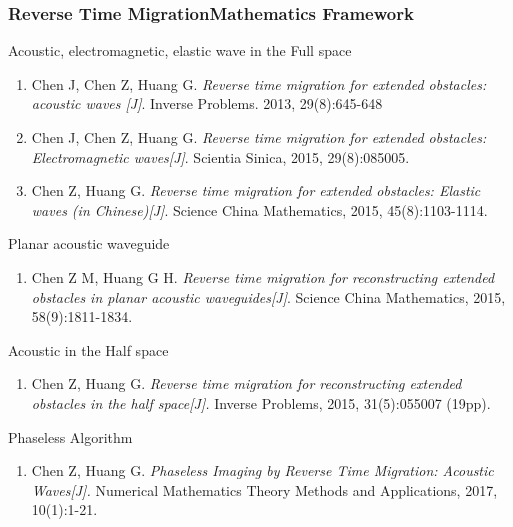 \documentclass[utf-8,8pt]{beamer}
\begin{document}
\begin{frame}
\frametitle{Reverse Time MigrationMathematics Framework}
\begin{small}
\begin{block}{Acoustic, electromagnetic, elastic wave in the Full space}
\begin{enumerate}
  \item Chen J, Chen Z, Huang G. {\it Reverse time migration for extended obstacles: acoustic waves [J]}. Inverse Problems. 2013, 29(8):645-648
  \item Chen J, Chen Z, Huang G. {\it Reverse time migration for extended obstacles: Electromagnetic waves[J]}. Scientia Sinica, 2015, 29(8):085005.
  \item Chen Z, Huang G. {\it Reverse time migration for extended obstacles: Elastic waves (in Chinese)[J]}. Science China Mathematics, 2015, 45(8):1103-1114.
\end{enumerate}
\end{block}
\begin{block}{Planar acoustic waveguide}
\begin{enumerate}
  \item Chen Z M, Huang G H. {\it Reverse time migration for reconstructing extended obstacles in planar acoustic waveguides[J]}. Science China Mathematics, 2015, 58(9):1811-1834.
\end{enumerate}
\end{block}

\begin{block}{Acoustic in the Half space}
\begin{enumerate}
  \item Chen Z, Huang G. {\it Reverse time migration for reconstructing extended obstacles in the half space[J].} Inverse Problems, 2015, 31(5):055007 (19pp).
\end{enumerate}
\end{block}

\begin{block}{Phaseless Algorithm}
\begin{enumerate}
  \item Chen Z, Huang G. {\it Phaseless Imaging by Reverse Time Migration: Acoustic Waves[J]. } Numerical Mathematics Theory Methods and Applications, 2017, 10(1):1-21.
\end{enumerate}
\end{block}
\end{small}

\end{frame}
\end{document}
